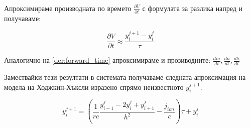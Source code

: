 \documentclass{article}
\begin{document}
    Апроксимираме производната по времето $\frac{\partial V}{\partial t}$ с формулата за разлика напред и получаваме:

    \begin{equation}\label{der:forward_time}
        \frac{\partial V}{\partial t} \approx \frac{y_i^{j+1} - y_i^j}{\tau}
    \end{equation}

    Аналогично на \eqref{der:forward_time} апроксимираме и прозиводните: $\frac{dm}{dt}, \frac{dn}{dt}, \frac{dh}{dt}$

    Замествайки тези резултати в системата получаваме следната апроксимация на модела на Ходжкин-Хъксли изразено спрямо неизвестното
    $y_i^{j+1}$.

    \begin{equation}
        y_i^{j+1} = \left(\frac{1}{rc}\frac{y_{i-1}^j - 2y_i^j + y_{i+1}^j}{h^2} - \frac{j_{ion}}{c}\right)\tau + y_i^j
    \end{equation}
\end{document}
